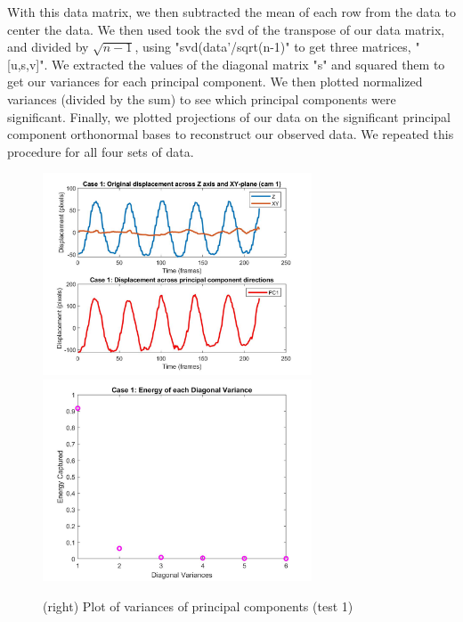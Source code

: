 \documentclass{article}
\begin{document}
	With this data matrix, we then subtracted the mean of each row from the data to center the data. We then used took the svd of the transpose of our data matrix, and divided by $\sqrt{n-1}$, using "svd(data'/sqrt(n-1)" to get three matrices, "[u,s,v]". We extracted the values of the diagonal matrix "s" and squared them to get our variances for each principal component. We then plotted normalized variances (divided by the sum) to see which principal components were significant. Finally, we plotted projections of our data on the significant principal component orthonormal bases to reconstruct our observed data. We repeated this procedure for all four sets of data.

\begin{figure}[H]
\begin{center}
\includegraphics[width = 8cm]{oscmotion1}
\includegraphics[width = 8cm]{energy1}
\caption{\label{fig:scaled_diss} (left)  Plots of original z displacement vs new basis (test1)}
\caption{\label{fig:scaled_diss} (right) Plot of variances of principal components (test 1)}
\end{center}
\end{figure}
\end{document}
